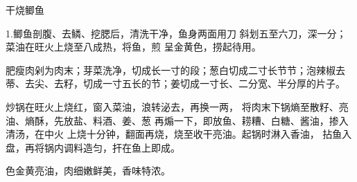 \begin{recipe}{干烧鲫鱼}

\ingredients



\cooking

 1.鲫鱼剖腹、去鳞、挖腮后，清洗干净，鱼身两面用刀 斜划五至六刀，深一分；菜油在旺火上烧至八成热，将鱼，煎 呈金黄色，捞起待用。

\step 肥瘦肉剁为肉末；芽菜洗净，切成长一寸的段；葱白切成二寸长节节；泡辣椒去蒂、去尖、去籽，切成一寸五长的节；姜切成一寸长、二分宽、半分厚的片子。

炒锅在旺火上烧红，窗入菜油，浪转泌去，再换一两， 将肉末下锅熵至散籽、亮油、熵酥，先放盐、料酒、姜、葱 再煽一下，即放鱼、耢糟、白糖、酱油，掺入清汤，在中火 上烧十分钟，翻面再烧，烧至收干亮油。起锅时淋入香油， 拈鱼入盘，再将锅内调料造匀，扞在鱼上即成。

\notes

色金黄亮油，肉细嫩鲜美，香味特浓。

\end{recipe}

